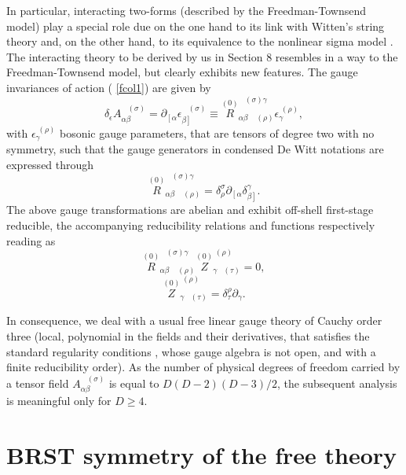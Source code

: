\documentclass[a4paper,12pt]{article}
\begin{document}
In particular, interacting two-forms (described by the Freedman-Townsend
model) play a special role due on the one hand to its link with Witten's
string theory \cite{string7} and, on the other hand, to its equivalence to
the nonlinear sigma model \cite{string8}. The interacting theory to be
derived by us in Section 8 resembles in a way to the Freedman-Townsend
model, but clearly exhibits new features. The gauge invariances of action (%
\ref{fcol1}) are given by 
\begin{equation}
\delta _{\epsilon }A_{\alpha \beta }^{\;\;\;(\sigma )}=\partial _{\left[
\alpha \right. }\epsilon _{\left. \beta \right] }^{\;\;\;(\sigma )}\equiv 
\stackrel{(0)}{R}_{\alpha \beta \;\;\;\;(\rho )}^{\;\;\;(\sigma )\gamma
}\epsilon _{\gamma }^{\;(\rho )},  \label{fcol3}
\end{equation}
with $\epsilon _{\gamma }^{\;(\rho )}$ bosonic gauge parameters, that are
tensors of degree two with no symmetry, such that the gauge generators in
condensed De Witt notations are expressed through 
\begin{equation}
\stackrel{(0)}{R}_{\alpha \beta \;\;\;\;(\rho )}^{\;\;\;(\sigma )\gamma
}=\delta _{\rho }^{\sigma }\partial _{\left[ \alpha \right. }\delta _{\left.
\beta \right] }^{\gamma }.  \label{fcol4}
\end{equation}
The above gauge transformations are abelian and exhibit off-shell
first-stage reducible, the accompanying reducibility relations and functions
respectively reading as 
\begin{equation}
\stackrel{(0)}{R}_{\alpha \beta \;\;\;\;(\rho )}^{\;\;\;(\sigma )\gamma }%
\stackrel{(0)}{Z}_{\gamma \;\;\;(\tau )}^{\;(\rho )}=0,  \label{fcol5}
\end{equation}
\begin{equation}
\stackrel{(0)}{Z}_{\gamma \;\;\;(\tau )}^{\;(\rho )}=\delta _{\tau }^{\rho
}\partial _{\gamma }.  \label{fcol6}
\end{equation}

In consequence, we deal with a usual free linear gauge theory of Cauchy
order three (local, polynomial in the fields and their derivatives, that
satisfies the standard regularity conditions \cite{32and12}, whose gauge
algebra is not open, and with a finite reducibility order). As the number of
physical degrees of freedom carried by a tensor field $A_{\alpha \beta
}^{\;\;\;(\sigma )}$ is equal to $D\left( D-2\right) \left( D-3\right) /2$,
the subsequent analysis is meaningful only for $D\geq 4$.

\section{BRST symmetry of the free theory}
\end{document}
